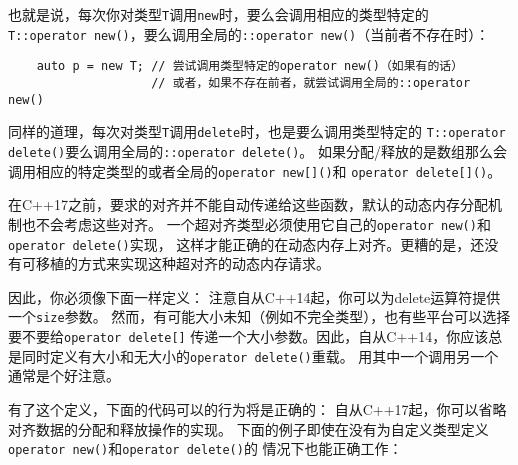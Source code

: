 也就是说，每次你对类型\texttt{T}调用\texttt{new}时，要么会调用相应的类型特定的
\texttt{T::operator new()}，要么调用全局的\texttt{::operator new()}（当前者不存在时）：
\begin{lstlisting}
    auto p = new T; // 尝试调用类型特定的operator new()（如果有的话）
                    // 或者，如果不存在前者，就尝试调用全局的::operator new()
\end{lstlisting}
同样的道理，每次对类型\texttt{T}调用\texttt{delete}时，也是要么调用类型特定的
\texttt{T::operator delete()}要么调用全局的\texttt{::operator delete()}。
如果分配/释放的是数组那么会调用相应的特定类型的或者全局的\texttt{operator new[]()}和
\texttt{operator delete[]()}。

在C++17之前，要求的对齐并不能自动传递给这些函数，默认的动态内存分配机制也不会考虑这些对齐。
一个超对齐类型必须使用它自己的\texttt{operator new()}和\texttt{operator delete()}实现，
这样才能正确的在动态内存上对齐。更糟的是，还没有可移植的方式来实现这种超对齐的动态内存请求。

因此，你必须像下面一样定义：
注意自从C++14起，你可以为delete运算符提供一个\texttt{size}参数。
然而，有可能大小未知（例如不完全类型），也有些平台可以选择要不要给\texttt{operator delete[]}
传递一个大小参数。因此，自从C++14，你应该总是同时定义有大小和无大小的\texttt{operator delete()}重载。
用其中一个调用另一个通常是个好注意。

有了这个定义，下面的代码可以的行为将是正确的：
自从C++17起，你可以省略对齐数据的分配和释放操作的实现。
下面的例子即使在没有为自定义类型定义\texttt{operator new()}和\texttt{operator delete()}的
情况下也能正确工作：

